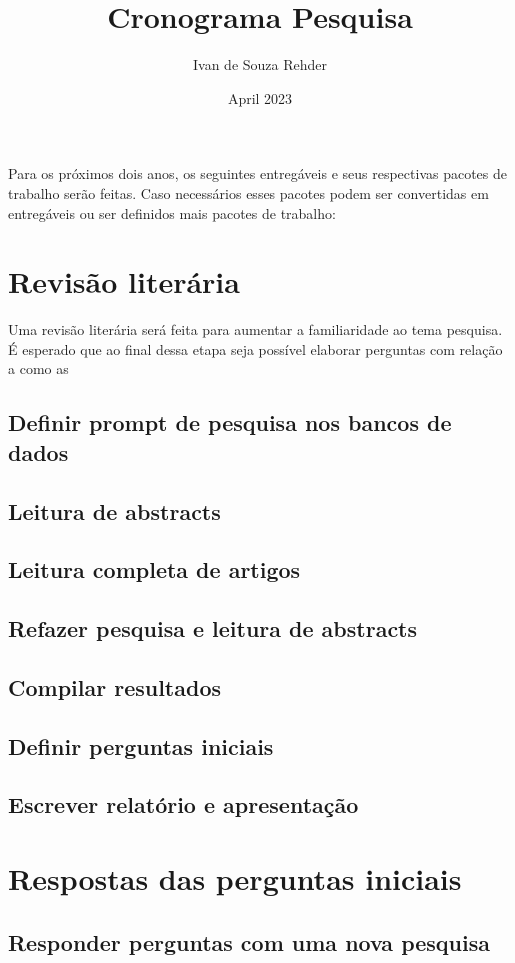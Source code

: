 \documentclass{article}
\title{Cronograma Pesquisa}
\author{Ivan de Souza Rehder}
\date{April 2023}
\begin{document}
\maketitle

Para os próximos dois anos, os seguintes entregáveis e seus respectivas pacotes de trabalho serão feitas. Caso necessários esses pacotes podem ser convertidas em entregáveis ou ser definidos mais pacotes de trabalho:

\section{Revisão literária}

Uma revisão literária será feita para aumentar a familiaridade ao tema pesquisa. É esperado que ao final dessa etapa seja possível elaborar perguntas com relação a como as 

\subsection{Definir prompt de pesquisa nos bancos de dados}
\subsection{Leitura de abstracts}
\subsection{Leitura completa de artigos}
\subsection{Refazer pesquisa e leitura de abstracts}
\subsection{Compilar resultados}
\subsection{Definir perguntas iniciais}
\subsection{Escrever relatório e apresentação}
\section{Respostas das perguntas iniciais}
\subsection{Responder perguntas com uma nova pesquisa}
\end{document}
